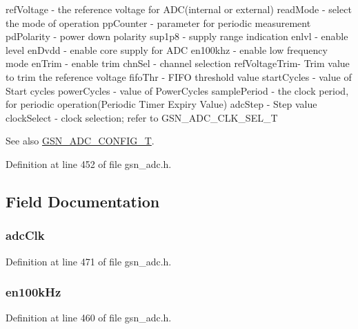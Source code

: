 refVoltage -\/ the reference voltage for ADC(internal or external) readMode -\/ select the mode of operation ppCounter -\/ parameter for periodic measurement pdPolarity -\/ power down polarity sup1p8 -\/ supply range indication enlvl -\/ enable level enDvdd -\/ enable core supply for ADC en100khz -\/ enable low frequency mode enTrim -\/ enable trim chnSel -\/ channel selection refVoltageTrim-\/ Trim value to trim the reference voltage fifoThr -\/ FIFO threshold value startCycles -\/ value of Start cycles powerCycles -\/ value of PowerCycles samplePeriod -\/ the clock period, for periodic operation(Periodic Timer Expiry Value) adcStep -\/ Step value clockSelect -\/ clock selection; refer to GSN\_\-ADC\_\-CLK\_\-SEL\_\-T

\begin{DoxySeeAlso}{See also}
\hyperlink{a00643_ga791ca7ba8984ef3e22b1790a1abd2bb4}{GSN\_\-ADC\_\-CONFIG\_\-T}. 
\end{DoxySeeAlso}


Definition at line 452 of file gsn\_\-adc.h.



\subsection{Field Documentation}
\hypertarget{a00023_a21f435c73f7e12852654e0d864ef487f}{
\subsubsection[{adcClk}]{ {\bf adcClk}}}
\label{a00023_a21f435c73f7e12852654e0d864ef487f}


Definition at line 471 of file gsn\_\-adc.h.

\hypertarget{a00023_a743957855a5247965447d3b99e55b55b}{
\subsubsection[{en100kHz}]{ {\bf en100kHz}}}
\label{a00023_a743957855a5247965447d3b99e55b55b}


Definition at line 460 of file gsn\_\-adc.h.

